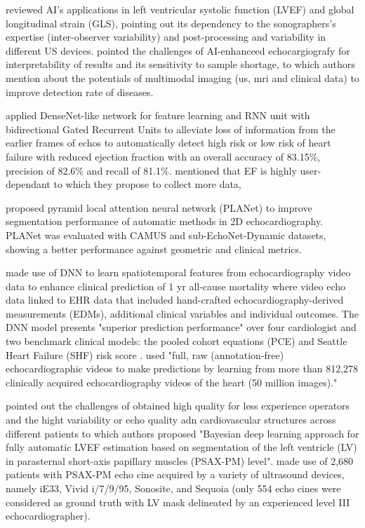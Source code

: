 \documentclass[mlabstract,twocolumn]{jmlr}
\begin{document}
\citet{zhang2022-mdpi}
reviewed AI's applications in left ventricular systolic function (LVEF) and global longitudinal strain (GLS), pointing out its dependency to the sonographers's expertise (inter-observer variability) and post-processing and variability in different US devices.
\citet{zhang2022-mdpi} pointed the challenges of AI-enhanceed echocargiografy for interpretability of results and its sensitivity to sample shortage, to which authors mention about the potentials of multimodal imaging (us, mri and clinical data) to improve detection rate of diseases.

\citet{behnami2020} applied DenseNet-like network for feature learning and RNN unit with bidirectional Gated Recurrent Units to alleviate loss of information from the earlier frames of echos to automatically detect high risk or low risk of heart failure with reduced ejection fraction with an overall accuracy of 83.15\%, precision of 82.6\% and recall of 81.1\%.
\citet{behnami2020} mentioned that EF is highly user-dependant to which they propose to collect more data,

\citet{liu2021JMIA} proposed pyramid local attention neural network (PLANet) to improve segmentation performance of automatic methods in 2D echocardiography.
PLANet was evaluated with CAMUS and sub-EchoNet-Dynamic datasets, showing a better performance against geometric and clinical metrics.

\citet{ulloaCerna2021} made use of DNN to learn spatiotemporal features from echocardiography video data to enhance clinical prediction of 1 yr all-cause mortality where video echo data linked to EHR data that included hand-crafted echocardiography-derived measurements (EDMs), additional clinical variables and individual outcomes.
The DNN model presents "superior prediction performance" over four cardiologist and two benchmark clinical models: the pooled cohort equations (PCE) and Seattle Heart Failure (SHF) risk score \citep{ulloaCerna2021}.
\citet{ulloaCerna2021} used "full, raw (annotation-free) echocardiographic videos to make predictions by learning from more than 812,278 clinically acquired echocardiography videos of the heart (50 million images)."

\citet{jafari2021} pointed out the challenges of obtained high quality for less experience operators and the hight variability or echo quality adn cardiovascular structures across different patients to which authors proposed "Bayesian deep learning approach for fully automatic LVEF estimation based on segmentation of the left ventricle (LV) in parasternal short-axis papillary muscles (PSAX-PM) level".
\citet{jafari2021} made use of 2,680 patients with PSAX-PM echo cine acquired by a variety of ultrasound devices, namely iE33, Vivid i/7/9/95, Sonosite, and Sequoia (only 554 echo cines were considered as ground truth with LV mask delineated by an experienced level III echocardiographer).
\end{document}
